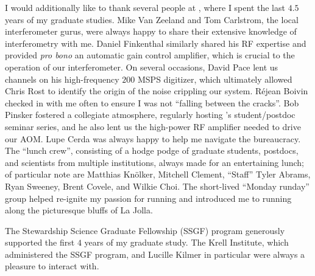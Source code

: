 I would additionally like to thank several people at \diiid,
where I spent the last $4.5$ years of my graduate studies.
Mike Van Zeeland and Tom Carlstrom,
the local interferometer gurus,
were always happy to share their extensive knowledge
of interferometry with me.
Daniel Finkenthal similarly shared his RF expertise and
provided \emph{pro bono} an automatic gain control amplifier, which
is crucial to the operation of our interferometer.
On several occasions, David Pace lent us channels
on his high-frequency $200$ MSPS digitizer, which
ultimately allowed Chris Rost to identify
the origin of the noise crippling our system.
R\'{e}jean Boivin checked in with me often
to ensure I was not ``falling between the cracks''.
Bob Pinsker fostered a collegiate atmosphere,
regularly hosting \diiid's student/postdoc seminar series, and
he also lent us the high-power RF amplifier needed to drive our AOM.
Lupe Cerda was always happy to help me navigate the \diiid\space bureaucracy.
The \diiid\space ``lunch crew'',
consisting of a hodge podge of graduate students, postdocs, and scientists
from multiple institutions,
always made for an entertaining lunch;
of particular note are
Matthias Kn{\"o}lker,
Mitchell Clement,
``Staff'' Tyler Abrams,
Ryan Sweeney,
Brent Covele, and
Wilkie Choi.
The short-lived ``Monday runday'' group
helped re-ignite my passion for running and
introduced me to running along the picturesque bluffs of La Jolla.

The Stewardship Science Graduate Fellowship (SSGF) program
generously supported the first $4$ years of my graduate study.
The Krell Institute, which administered the SSGF program, and
Lucille Kilmer in particular
were always a pleasure to interact with.

